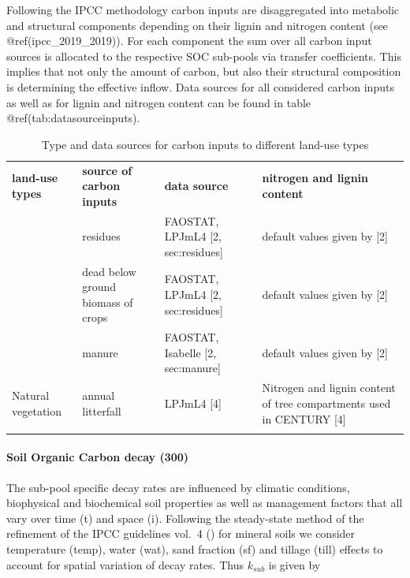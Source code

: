 \documentclass[gc, manuscript]{copernicus}
\begin{document}
Following the IPCC methodology carbon inputs are disaggregated into
metabolic and structural components depending on their lignin and
nitrogen content (see @ref(ipcc\_2019\_2019)). For each component the
sum over all carbon input sources is allocated to the respective SOC
sub-pools via transfer coefficients. This implies that not only the
amount of carbon, but also their structural composition is determining
the effective inflow. Data sources for all considered carbon inputs as
well as for lignin and nitrogen content can be found in table
@ref(tab:datasourceinputs).

 \begin{table}[h]
 \caption{Type and data sources for carbon inputs to different land-use types }
 \begin{tabular}{l l l l}
 \tophline
  \textbf{land-use types}   & \textbf{source of carbon inputs} & \textbf{data source} & \textbf{nitrogen and lignin content} \\
 \middlehline
 \multirow{3}{*}{Cropland} & residues & FAOSTAT, LPJmL4 [2, sec:residues] & default values given by [2]  \\
                            & dead below ground biomass of crops & FAOSTAT, LPJmL4 [2, sec:residues] & default values given by [2] \\
                            & manure & FAOSTAT, Isabelle [2, sec:manure] & default values given by [2] \\
                            \hline
  Natural vegetation        & annual litterfall & LPJmL4 [4]& \begin{minipage}[t]{0.28\columnwidth}\raggedright\strut Nitrogen and lignin content of tree compartments used in CENTURY [4] \strut \end{minipage}\tabularnewline
 \bottomhline
 \end{tabular}
 \label{tab:datasourceinputs}
 \belowtable{}
 \end{table}

\hypertarget{sec:tier2}{%
\paragraph{Soil Organic Carbon decay (300)}\label{sec:tier2}}

The sub-pool specific decay rates are influenced by climatic conditions,
biophysical and biochemical soil properties as well as management
factors that all vary over time (t) and space (i). Following the
steady-state method of the refinement of the IPCC guidelines vol.~4
(\citet{ipcc_2019_2019}) for mineral soils we consider temperature
(temp), water (wat), sand fraction (sf) and tillage (till) effects to
account for spatial variation of decay rates. Thus \(k_{sub}\) is given
by
\end{document}
